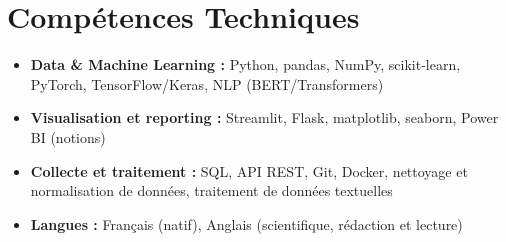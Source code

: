 \documentclass[a4paper,11pt]{article}
\begin{document}
\section{Compétences Techniques}
\begin{itemize}[leftmargin=*, nosep]
    \item \small{\textbf{Data \& Machine Learning :} Python, pandas, NumPy, scikit-learn, PyTorch, TensorFlow/Keras, NLP (BERT/Transformers)}
    \item \small{\textbf{Visualisation et reporting :} Streamlit, Flask, matplotlib, seaborn, Power BI (notions)}
    \item \small{\textbf{Collecte et traitement :} SQL, API REST, Git, Docker, nettoyage et normalisation de données, traitement de données textuelles}
    \item \small{\textbf{Langues :} Français (natif), Anglais (scientifique, rédaction et lecture)}
\end{itemize}

\end{document}

